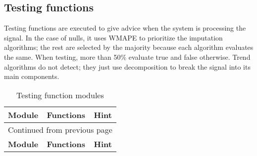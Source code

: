 \documentclass[a4paper]{article}
\begin{document}
\subsection{Testing functions}
\label{sec:org5511dfd}

Testing functions are executed to give advice when the system is processing the signal. In the case of nulls, it uses WMAPE to prioritize the imputation algorithms; the rest are selected by the majority because each algorithm evaluates the same. When testing, more than 50\% evaluate true and false otherwise. Trend algorithms do not detect; they just use decomposition to break the signal into its main components.

\begin{longtable}{lll}
\caption{Testing function modules}
\\[0pt]
\textbf{Module} & \textbf{Functions} & \textbf{Hint}\\[0pt]
\hline
\endfirsthead
\multicolumn{3}{l}{Continued from previous page} \\[0pt]
\hline

\textbf{Module} & \textbf{Functions} & \textbf{Hint} \\[0pt]


\end{longtable}
\end{document}
